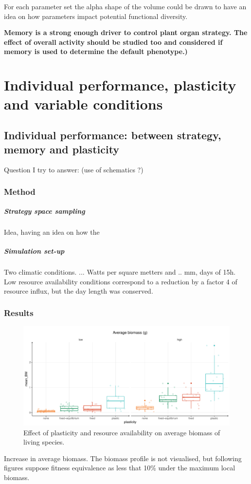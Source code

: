 For each parameter set the alpha shape of the volume could be drawn to have an idea on how parameters impact potential functional diversity.


\textbf{Memory is a strong enough driver to control plant organ strategy. The effect of overall activity should be studied too and considered if memory is used to determine the default phenotype.)}

\chapter{Individual performance, plasticity and variable conditions}
\section{Individual performance: between strategy, memory and plasticity}

Question I try to answer: (use of schematics ?)

\subsection{Method}

\paragraph{Strategy space sampling}
Idea, having an idea on how the 

\paragraph{Simulation set-up}
Two climatic conditions. ... Watts per square metters and .. mm, days of 15h. Low resource availability conditions correspond to a reduction by a factor 4 of resource influx, but the day length was conserved.

\subsection{Results}


\begin{figure}\label{fig:w_ini_p_as_r}
\includegraphics[width = \textwidth]{./2_PP/Figures/plot_BM_allocation.pdf}
\caption{Effect of plasticity and resource availability on average biomass of living species.}
\end{figure}
Increase in average biomass. The biomass profile is not visualised, but following figures suppose fitness equivalence as less that 10\% under the maximum local biomass.

